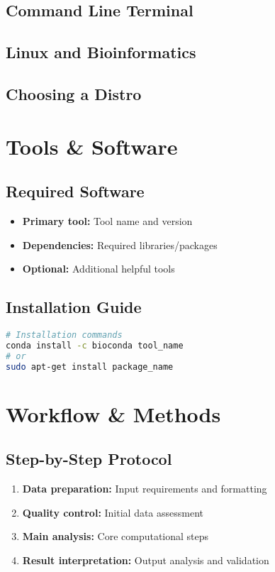 \documentclass[a4paper,11pt]{article}
\begin{document}
\subsection{Command Line Terminal}
\subsection{Linux and Bioinformatics}

\subsection{Choosing a Distro}
\section{Tools \& Software}

\subsection{Required Software}

\begin{itemize}
    \item \textbf{Primary tool:} Tool name and version
    \item \textbf{Dependencies:} Required libraries/packages
    \item \textbf{Optional:} Additional helpful tools
\end{itemize}

\subsection{Installation Guide}
\begin{lstlisting}[language=bash, caption=Software installation]
# Installation commands
conda install -c bioconda tool_name
# or
sudo apt-get install package_name
\end{lstlisting}

\section{Workflow \& Methods}

\subsection{Step-by-Step Protocol}

\begin{enumerate}
    \item \textbf{Data preparation:} Input requirements and formatting
    \item \textbf{Quality control:} Initial data assessment
    \item \textbf{Main analysis:} Core computational steps
    \item \textbf{Result interpretation:} Output analysis and validation
\end{enumerate}
\end{document}
